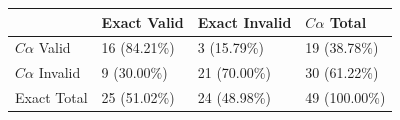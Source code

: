 \begin{tabular}{llll}
\toprule
 & Exact Valid & Exact Invalid & $C\alpha$ Total \\
\midrule
$C\alpha$ Valid & 16 (84.21\%) & 3 (15.79\%) & 19 (38.78\%) \\
$C\alpha$ Invalid & 9 (30.00\%) & 21 (70.00\%) & 30 (61.22\%) \\
Exact Total & 25 (51.02\%) & 24 (48.98\%) & 49 (100.00\%) \\
\bottomrule
\end{tabular}
